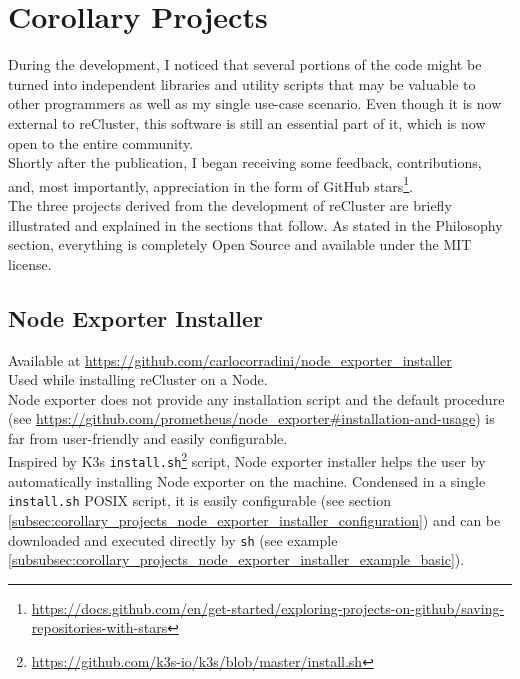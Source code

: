 \chapter{Corollary Projects}
\label{cha:corollary_projects}

During the development, I noticed that several portions of the code might be
turned into independent libraries and utility scripts that may be valuable to
other programmers as well as my single use-case scenario. Even though it is now external
to reCluster, this software is still an essential part of it, which is now open to
the entire community. \\ %
Shortly after the publication, I began receiving some feedback, contributions,
and, most importantly, appreciation in the form of GitHub stars\footnote{\url{https://docs.github.com/en/get-started/exploring-projects-on-github/saving-repositories-with-stars}}.
\\ %
The three projects derived from the development of reCluster are briefly
illustrated and explained in the sections that follow. As stated in the Philosophy
section, everything is completely Open Source and available under the MIT
license.

\section{Node Exporter Installer}
\label{sec:corollary_projects_node_exporter_installer}

Available at \url{https://github.com/carlocorradini/node\_exporter\_installer} \\ %
Used while installing reCluster on a Node. \\ %
Node exporter does not provide any installation script and the default procedure
(see \url{https://github.com/prometheus/node_exporter#installation-and-usage})
is far from user-friendly and easily configurable. \\ %
Inspired by K3s \texttt{install.sh}\footnote{\url{https://github.com/k3s-io/k3s/blob/master/install.sh}}
script, Node exporter installer helps the user by automatically installing Node
exporter on the machine. Condensed in a single \texttt{install.sh} POSIX script,
it is easily configurable (see section
\ref{subsec:corollary_projects_node_exporter_installer_configuration}) and can be
downloaded and executed directly by \texttt{sh} (see example \ref{subsubsec:corollary_projects_node_exporter_installer_example_basic}).

